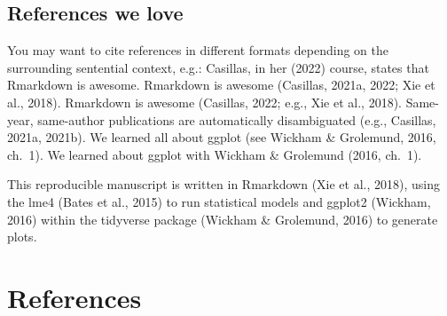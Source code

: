 \documentclass[
]{article}
\begin{document}
\hypertarget{references-we-love}{%
\subsection{References we love}\label{references-we-love}}

You may want to cite references in different formats depending on the surrounding sentential context, e.g.: Casillas, in her (2022) course, states that Rmarkdown is awesome. Rmarkdown is awesome (Casillas, 2021a, 2022; Xie et al., 2018). Rmarkdown is awesome (Casillas, 2022; e.g., Xie et al., 2018). Same-year, same-author publications are automatically disambiguated (e.g., Casillas, 2021a, 2021b). We learned all about ggplot (see Wickham \& Grolemund, 2016, ch.~1). We learned about ggplot with Wickham \& Grolemund (2016, ch.~1).

This reproducible manuscript is written in Rmarkdown (Xie et al., 2018), using the lme4 (Bates et al., 2015) to run statistical models and ggplot2 (Wickham, 2016) within the tidyverse package (Wickham \& Grolemund, 2016) to generate plots.

\hypertarget{references}{%
\section{References}\label{references}}
\end{document}
